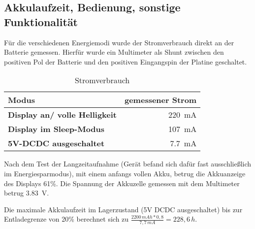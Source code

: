 \subsection{Akkulaufzeit, Bedienung, sonstige Funktionalität}

Für die verschiedenen Energiemodi wurde der Stromverbrauch direkt an der Batterie gemessen. Hierfür wurde ein Multimeter als Shunt zwischen den positiven Pol der Batterie und den positiven Eingangspin der Platine geschaltet.\\

\begin{table}

\begin{tabular}[]{l|r}
\textbf{Modus} & \textbf{gemessener Strom} 
\\
\hline
\textbf{Display an/ volle Helligkeit} & \SI{220}{\milli\ampere} 
\\
\hline
\textbf{Display im Sleep-Modus} & \SI{107}{\milli\ampere} 
\\
\hline
\textbf{5V-DCDC ausgeschaltet} & \SI{7,7}{\milli\ampere}
\end{tabular}

\caption{Stromverbrauch}
\label{tab:Stromverbrauch}

\end{table}

Nach dem Test der Langzeitaufnahme (Gerät befand sich dafür fast ausschließlich im Energiesparmodus), mit einem anfangs vollen Akku, betrug die Akkuanzeige des Displays 61\%. Die Spannung der Akkuzelle gemessen mit dem Multimeter betrug \SI{3,83}{\volt}.

Die maximale Akkulaufzeit im Lagerzustand (5V DCDC ausgeschaltet) bis zur Entladegrenze von 20\% berechnet sich zu
$ \frac{2200\,mAh*0,8}{7,7\,mA} = 228,6\,h $.
